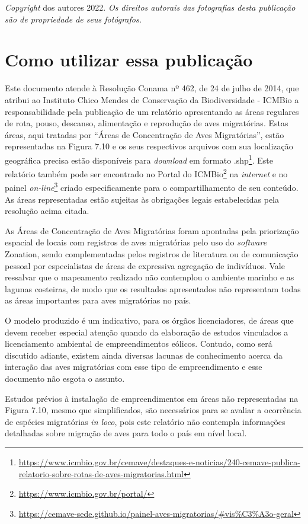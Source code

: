 \documentclass[
  oneside]{scrbook}
\DeclareRobustCommand{\href}[2]{#2\footnote{\url{#1}}}
\begin{document}
\emph{Copyright} dos autores 2022. \emph{Os direitos autorais das fotografias desta publicação são de propriedade de seus fotógrafos.}

\hypertarget{como-utilizar}{%
\chapter*{Como utilizar essa publicação}\label{como-utilizar}}


Este documento atende à Resolução Conama nº 462, de 24 de julho de 2014, que atribui ao Instituto Chico Mendes de Conservação da Biodiversidade - ICMBio a responsabilidade pela publicação de um relatório apresentando as áreas regulares de rota, pouso, descanso, alimentação e reprodução de aves migratórias. Estas áreas, aqui tratadas por ``Áreas de Concentração de Aves Migratórias'', estão representadas na Figura 7.10 e os seus respectivos arquivos com sua localização geográfica precisa estão \href{https://www.icmbio.gov.br/cemave/destaques-e-noticias/240-cemave-publica-relatorio-sobre-rotas-de-aves-migratorias.html}{disponíveis para \emph{download} em formato .shp}. Este relatório também pode ser encontrado no \href{https://www.icmbio.gov.br/portal/}{Portal do ICMBio} na \emph{internet} e no \href{https://cemave-sede.github.io/painel-aves-migratorias/\#vis\%C3\%A3o-geral}{painel \emph{on-line}} criado especificamente para o compartilhamento de seu conteúdo. As áreas representadas estão sujeitas às obrigações legais estabelecidas pela resolução acima citada.

As Áreas de Concentração de Aves Migratórias foram apontadas pela priorização espacial de locais com registros de aves migratórias pelo uso do \emph{software} Zonation, sendo complementadas pelos registros de literatura ou de comunicação pessoal por especialistas de áreas de expressiva agregação de indivíduos. Vale ressalvar que o mapeamento realizado não contemplou o ambiente marinho e as lagunas costeiras, de modo que os resultados apresentados não representam todas as áreas importantes para aves migratórias no país.

O modelo produzido é um indicativo, para os órgãos licenciadores, de áreas que devem receber especial atenção quando da elaboração de estudos vinculados a licenciamento ambiental de empreendimentos eólicos. Contudo, como será discutido adiante, existem ainda diversas lacunas de conhecimento acerca da interação das aves migratórias com esse tipo de empreendimento e esse documento não esgota o assunto.

Estudos prévios à instalação de empreendimentos em áreas não representadas na Figura 7.10, mesmo que simplificados, são necessários para se avaliar a ocorrência de espécies migratórias \emph{in loco}, pois este relatório não contempla informações detalhadas sobre migração de aves para todo o país em nível local.
\end{document}
